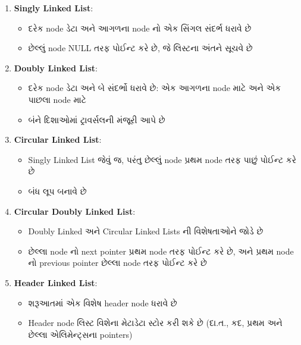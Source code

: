 \documentclass{article}
\providecommand{\tightlist}{%
\setlength{\itemsep}{0pt}\setlength{\parskip}{0pt}}
\begin{document}
\begin{enumerate}
\def\labelenumi{\arabic{enumi}.}
\tightlist
\item
  \textbf{Singly Linked List}:

  \begin{itemize}
  \tightlist
  \item
    દરેક node ડેટા અને આગળના node નો એક સિંગલ સંદર્ભ ધરાવે છે
  \item
    છેલ્લું node NULL તરફ પોઈન્ટ કરે છે, જે લિસ્ટના અંતને સૂચવે છે
  \end{itemize}
\item
  \textbf{Doubly Linked List}:

  \begin{itemize}
  \tightlist
  \item
    દરેક node ડેટા અને બે સંદર્ભો ધરાવે છે: એક આગળના node માટે અને એક પાછલા node
    માટે
  \item
    બંને દિશાઓમાં ટ્રાવર્સલની મંજૂરી આપે છે
  \end{itemize}
\item
  \textbf{Circular Linked List}:

  \begin{itemize}
  \tightlist
  \item
    Singly Linked List જેવું જ, પરંતુ છેલ્લું node પ્રથમ node તરફ પાછું પોઈન્ટ કરે છે
  \item
    બંધ લૂપ બનાવે છે
  \end{itemize}
\item
  \textbf{Circular Doubly Linked List}:

  \begin{itemize}
  \tightlist
  \item
    Doubly Linked અને Circular Linked Lists ની વિશેષતાઓને જોડે છે
  \item
    છેલ્લા node નો next pointer પ્રથમ node તરફ પોઈન્ટ કરે છે, અને પ્રથમ node નો
    previous pointer છેલ્લા node તરફ પોઈન્ટ કરે છે
  \end{itemize}
\item
  \textbf{Header Linked List}:

  \begin{itemize}
  \tightlist
  \item
    શરૂઆતમાં એક વિશેષ header node ધરાવે છે
  \item
    Header node લિસ્ટ વિશેના મેટાડેટા સ્ટોર કરી શકે છે (દા.ત., કદ, પ્રથમ અને છેલ્લા
    એલિમેન્ટ્સના pointers)
  \end{itemize}
\end{enumerate}
\end{document}
